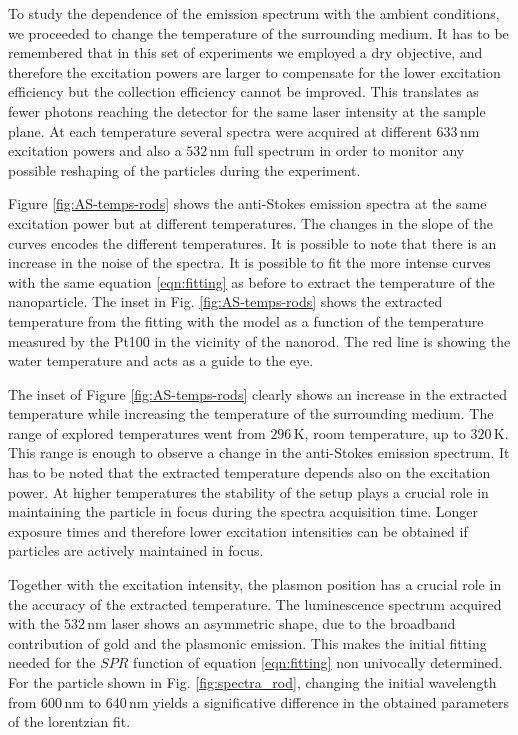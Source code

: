 \documentclass[journal=nalefd,manuscript=letter]{achemso}
\newcommand{\K}{\ensuremath{\,\textrm{K}}}
\newcommand{\nm}{\ensuremath{\,\textrm{nm}}}
\begin{document}
To study the dependence of the emission spectrum with the ambient conditions, we
proceeded to change the temperature of the surrounding medium. It has to be
remembered that in this set of experiments we employed a dry objective, and
therefore the excitation powers are larger to compensate for the lower
excitation efficiency but the collection efficiency cannot be improved. This
translates as fewer photons reaching the detector for the same laser intensity
at the sample plane. At each temperature several spectra were acquired at
different $633\nm$ excitation powers and also a $532\nm$ full spectrum in order
to monitor any possible reshaping of the particles during the experiment.

Figure \ref{fig:AS-temps-rods} shows the anti-Stokes emission spectra at the
same excitation power but at different temperatures. The changes in the slope of
the curves encodes the different temperatures. It is possible to note that there
is an increase in the noise of the spectra. It is possible to fit the more
intense curves with the same equation \ref{eqn:fitting} as before to extract the
temperature of the nanoparticle. The inset in Fig. \ref{fig:AS-temps-rods} shows
the extracted temperature from the fitting with the model as a function of the
temperature measured by the Pt100 in the vicinity of the nanorod. The red line
is showing the water temperature and acts as a guide to the eye. 

The inset of Figure \ref{fig:AS-temps-rods} clearly shows an increase in the
extracted temperature while increasing the temperature of the surrounding
medium. The range of explored temperatures went from $296\K$, room temperature,
up to $320\K$. This range is enough to observe a change in the anti-Stokes
emission spectrum. It has to be noted that the extracted temperature depends
also on the excitation power. At higher temperatures the stability of the setup
plays a crucial role in maintaining the particle in focus during the spectra
acquisition time. Longer exposure times and therefore lower excitation
intensities can be obtained if particles are actively maintained in focus.

Together with the excitation intensity, the plasmon position has a crucial role
in the accuracy of the extracted temperature. The luminescence spectrum acquired
with the $532\nm$ laser shows an asymmetric shape, due to the broadband
contribution of gold and the plasmonic emission. This makes the initial fitting
needed for the $SPR$ function of equation \ref{eqn:fitting} non univocally
determined. For the particle shown in Fig. \ref{fig:spectra_rod}, changing the
initial wavelength from $600\nm$ to $640\nm$ yields a significative difference
in the obtained parameters of the lorentzian fit.
\end{document}
